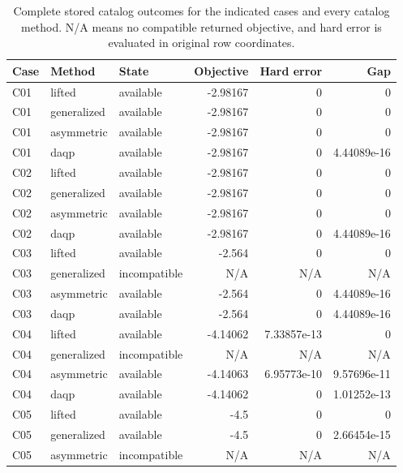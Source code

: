 \begin{table}[htbp]\centering\footnotesize
\caption{Complete stored catalog outcomes for the indicated cases and every catalog method. N/A means no compatible returned objective, and hard error is evaluated in original row coordinates.}\label{tab:catalog-1}
\begin{tabularx}{\textwidth}{@{}ll>{\raggedright\arraybackslash}Xrrr@{}}\toprule
Case & Method & State & Objective & Hard error & Gap\\\midrule
C01 & lifted & available & -2.\allowbreak{}98167 & 0 & 0\\
C01 & generalized & available & -2.\allowbreak{}98167 & 0 & 0\\
C01 & asymmetric & available & -2.\allowbreak{}98167 & 0 & 0\\
C01 & daqp & available & -2.\allowbreak{}98167 & 0 & 4.\allowbreak{}44089e-16\\
C02 & lifted & available & -2.\allowbreak{}98167 & 0 & 0\\
C02 & generalized & available & -2.\allowbreak{}98167 & 0 & 0\\
C02 & asymmetric & available & -2.\allowbreak{}98167 & 0 & 0\\
C02 & daqp & available & -2.\allowbreak{}98167 & 0 & 4.\allowbreak{}44089e-16\\
C03 & lifted & available & -2.\allowbreak{}564 & 0 & 0\\
C03 & generalized & incompatible & N/\allowbreak{}A & N/\allowbreak{}A & N/\allowbreak{}A\\
C03 & asymmetric & available & -2.\allowbreak{}564 & 0 & 4.\allowbreak{}44089e-16\\
C03 & daqp & available & -2.\allowbreak{}564 & 0 & 4.\allowbreak{}44089e-16\\
C04 & lifted & available & -4.\allowbreak{}14062 & 7.\allowbreak{}33857e-13 & 0\\
C04 & generalized & incompatible & N/\allowbreak{}A & N/\allowbreak{}A & N/\allowbreak{}A\\
C04 & asymmetric & available & -4.\allowbreak{}14063 & 6.\allowbreak{}95773e-10 & 9.\allowbreak{}57696e-11\\
C04 & daqp & available & -4.\allowbreak{}14062 & 0 & 1.\allowbreak{}01252e-13\\
C05 & lifted & available & -4.\allowbreak{}5 & 0 & 0\\
C05 & generalized & available & -4.\allowbreak{}5 & 0 & 2.\allowbreak{}66454e-15\\
C05 & asymmetric & incompatible & N/\allowbreak{}A & N/\allowbreak{}A & N/\allowbreak{}A\\

\end{tabularx}
\end{table}

